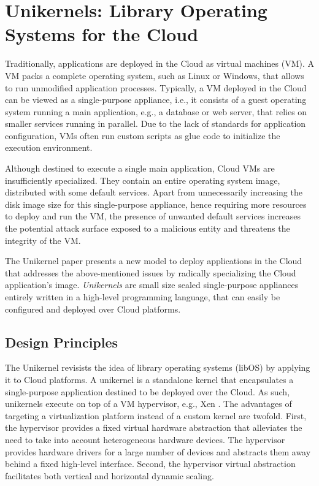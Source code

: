 \section{Unikernels: Library Operating Systems for the Cloud}
Traditionally, applications are deployed in the Cloud as virtual machines (VM).
A VM packs a complete operating system, such as Linux or Windows, that allows to run unmodified application processes.
Typically, a VM deployed in the Cloud can be viewed as a single-purpose appliance, i.e., it consists of a guest operating system running a main application, e.g., a database or web server, that relies on smaller services running in parallel.
Due to the lack of standards for application configuration, VMs often run custom scripts as glue code to initialize the execution environment.

Although destined to execute a single main application, Cloud VMs are insufficiently specialized.
They contain an entire operating system image, distributed with some default services.
Apart from unnecessarily increasing the disk image size for this single-purpose appliance, hence requiring more resources to deploy and run the VM, the presence of unwanted default services increases the potential attack surface exposed to a malicious entity and threatens the integrity of the VM.

The Unikernel paper \cite{DBLP:conf/asplos/MadhavapeddyMRSSGSHC13} presents a new model to deploy applications in the Cloud that addresses the above-mentioned issues by radically specializing the Cloud application's image.
\emph{Unikernels} are small size sealed single-purpose appliances entirely written in a high-level programming language, that can easily be configured and deployed over Cloud platforms.


\subsection{Design Principles}
The Unikernel revisists the idea of library operating systems (libOS) by applying it to Cloud platforms.
A unikernel is a standalone kernel that encapsulates a single-purpose application destined to be deployed over the Cloud.
As such, unikernels execute on top of a VM hypervisor, e.g., Xen \cite{DBLP:conf/sosp/BarhamDFHHHN03}.
The advantages of targeting a virtualization platform instead of a custom kernel are twofold.
First, the hypervisor provides a fixed virtual hardware abstraction that alleviates the need to take into account heterogeneous hardware devices.
The hypervisor provides hardware drivers for a large number of devices and abstracts them away behind a fixed high-level interface.
Second, the hypervisor virtual abstraction facilitates both vertical and horizontal dynamic scaling.

